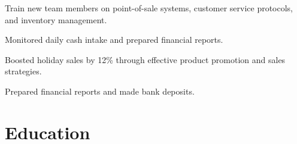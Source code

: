 \documentclass[letterpaper,10pt]{article}
\begin{document}
  \begin{resume_list}
    \item Train new team members on point-of-sale systems, customer service protocols, and inventory management.
	\item Monitored daily cash intake and prepared financial reports.
	\item Boosted holiday sales by 12\% through effective product promotion and sales strategies.
    \item Prepared financial reports and made bank deposits.
  \end{resume_list}
  

  \section{Education}

  \vspace{10pt}
\end{document}
